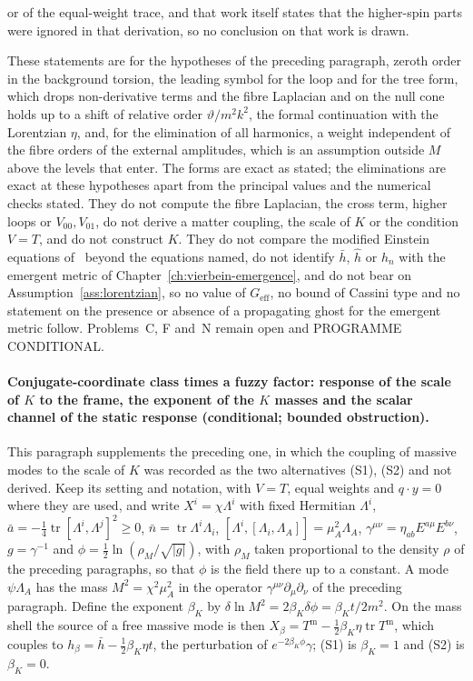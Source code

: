 or of the equal-weight trace, and that work itself states that the higher-spin parts were ignored in that derivation, so no conclusion on that work is drawn.

These statements are for the hypotheses of the preceding paragraph, zeroth order in the background torsion, the leading symbol for the loop and for the tree form, which drops non-derivative terms and the fibre Laplacian and on the null cone holds up to a shift of relative order \(\vartheta/m^2k^2\), the formal continuation with the Lorentzian \(\eta\), and, for the elimination of all harmonics, a weight independent of the fibre orders of the external amplitudes, which is an assumption outside \(M\) above the levels that enter. The forms are exact as stated; the eliminations are exact at these hypotheses apart from the principal values and the numerical checks stated. They do not compute the fibre Laplacian, the cross term, higher loops or \(V_{00},V_{01}\), do not derive a matter coupling, the scale of \(K\) or the condition \(V=T\), and do not construct \(K\). They do not compare the modified Einstein equations of~\cite{KumarSteinacker2023,Steinacker2026} beyond the equations named, do not identify \(\bar h\), \(\hat h\) or \(h_n\) with the emergent metric of Chapter~\ref{ch:vierbein-emergence}, and do not bear on Assumption~\ref{ass:lorentzian}, so no value of \(G_{\mathrm{eff}}\), no bound of Cassini type and no statement on the presence or absence of a propagating ghost for the emergent metric follow. Problems~C, F and~N remain open and PROGRAMME CONDITIONAL.

\paragraph{Conjugate-coordinate class times a fuzzy factor: response of the scale of \(K\) to the frame, the exponent of the \(K\) masses and the scalar channel of the static response (conditional; bounded obstruction).}
This paragraph supplements the preceding one, in which the coupling of massive modes to the scale of \(K\) was recorded as the two alternatives (S1), (S2) and not derived. Keep its setting and notation, with \(V=T\), equal weights and \(q\cdot y=0\) where they are used, and write \(X^i=\chi\Lambda^i\) with fixed Hermitian \(\Lambda^i\), \(\bar a=-\tfrac14\operatorname{tr}[\Lambda^i,\Lambda^j]^2\ge0\), \(\bar n=\operatorname{tr}\Lambda^i\Lambda_i\), \([\Lambda^i,[\Lambda_i,\Lambda_A]]=\mu_A^2\Lambda_A\), \(\gamma^{\mu\nu}=\eta_{ab}E^{a\mu}E^{b\nu}\), \(g=\gamma^{-1}\) and \(\phi=\tfrac12\ln(\rho_M/\sqrt{|g|})\), with \(\rho_M\) taken proportional to the density \(\rho\) of the preceding paragraphs, so that \(\phi\) is the field there up to a constant. A mode \(\psi\Lambda_A\) has the mass \(M^2=\chi^2\mu_A^2\) in the operator \(\gamma^{\mu\nu}\partial_\mu\partial_\nu\) of the preceding paragraph. Define the exponent \(\beta_K\) by \(\delta\ln M^2=2\beta_K\delta\phi=\beta_Kt/2m^2\). On the mass shell the source of a free massive mode is then \(X_\beta=T^{\mathrm m}-\tfrac12\beta_K\eta\operatorname{tr}T^{\mathrm m}\), which couples to \(h_\beta=\bar h-\tfrac12\beta_K\eta t\), the perturbation of \(e^{-2\beta_K\phi}\gamma\); (S1) is \(\beta_K=1\) and (S2) is \(\beta_K=0\).

